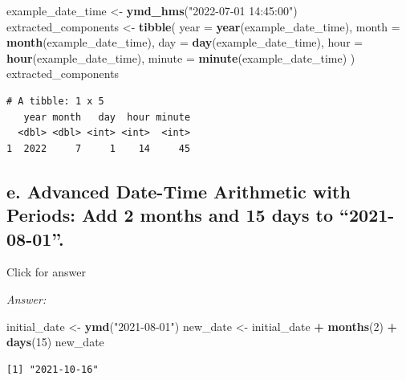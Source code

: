 \documentclass[
]{book}
\newenvironment{Shaded}{\begin{snugshade}}{\end{snugshade}}
\newcommand{\AttributeTok}[1]{\textcolor[rgb]{0.13,0.29,0.53}{#1}}
\newcommand{\DecValTok}[1]{\textcolor[rgb]{0.00,0.00,0.81}{#1}}
\newcommand{\FunctionTok}[1]{\textcolor[rgb]{0.13,0.29,0.53}{\textbf{#1}}}
\newcommand{\NormalTok}[1]{#1}
\newcommand{\OtherTok}[1]{\textcolor[rgb]{0.56,0.35,0.01}{#1}}
\newcommand{\SpecialCharTok}[1]{\textcolor[rgb]{0.81,0.36,0.00}{\textbf{#1}}}
\newcommand{\StringTok}[1]{\textcolor[rgb]{0.31,0.60,0.02}{#1}}
\begin{document}
\begin{Shaded}
\begin{Highlighting}[]
\NormalTok{example\_date\_time }\OtherTok{\textless{}{-}} \FunctionTok{ymd\_hms}\NormalTok{(}\StringTok{"2022{-}07{-}01 14:45:00"}\NormalTok{)}
\NormalTok{extracted\_components }\OtherTok{\textless{}{-}} \FunctionTok{tibble}\NormalTok{(}
  \AttributeTok{year =} \FunctionTok{year}\NormalTok{(example\_date\_time),}
  \AttributeTok{month =} \FunctionTok{month}\NormalTok{(example\_date\_time),}
  \AttributeTok{day =} \FunctionTok{day}\NormalTok{(example\_date\_time),}
  \AttributeTok{hour =} \FunctionTok{hour}\NormalTok{(example\_date\_time),}
  \AttributeTok{minute =} \FunctionTok{minute}\NormalTok{(example\_date\_time)}
\NormalTok{)}
\NormalTok{extracted\_components}
\end{Highlighting}
\end{Shaded}

\begin{verbatim}
# A tibble: 1 x 5
   year month   day  hour minute
  <dbl> <dbl> <int> <int>  <int>
1  2022     7     1    14     45
\end{verbatim}

\hypertarget{e.-advanced-date-time-arithmetic-with-periods-add-2-months-and-15-days-to-2021-08-01.}{%
\subsection{e. Advanced Date-Time Arithmetic with Periods: Add 2 months and 15 days to ``2021-08-01''.}\label{e.-advanced-date-time-arithmetic-with-periods-add-2-months-and-15-days-to-2021-08-01.}}

Click for answer

\emph{Answer:}

\begin{Shaded}
\begin{Highlighting}[]
\NormalTok{initial\_date }\OtherTok{\textless{}{-}} \FunctionTok{ymd}\NormalTok{(}\StringTok{"2021{-}08{-}01"}\NormalTok{)}
\NormalTok{new\_date }\OtherTok{\textless{}{-}}\NormalTok{ initial\_date }\SpecialCharTok{+} \FunctionTok{months}\NormalTok{(}\DecValTok{2}\NormalTok{) }\SpecialCharTok{+} \FunctionTok{days}\NormalTok{(}\DecValTok{15}\NormalTok{)}
\NormalTok{new\_date}
\end{Highlighting}
\end{Shaded}

\begin{verbatim}
[1] "2021-10-16"
\end{verbatim}
\end{document}
